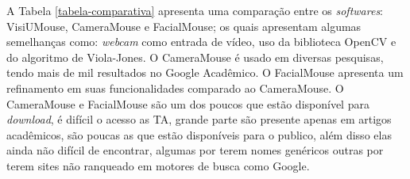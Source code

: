 A Tabela \ref{tabela-comparativa} apresenta uma comparação entre os \textit{softwares}: VisiUMouse, CameraMouse e FacialMouse; os quais apresentam algumas semelhanças como: \textit{webcam} como entrada de vídeo, uso da biblioteca OpenCV e do algoritmo de Viola-Jones. O CameraMouse é usado em diversas pesquisas, tendo mais de mil resultados no Google Acadêmico. O FacialMouse apresenta um refinamento em suas funcionalidades comparado ao CameraMouse. O CameraMouse e FacialMouse são um dos poucos que estão disponível para \textit{download}, é difícil o acesso as TA, grande parte são presente apenas em artigos acadêmicos, são poucas as que estão disponíveis para o publico, além disso elas ainda não difícil de encontrar, algumas por terem nomes genéricos outras por terem sites não ranqueado em motores de busca como Google.
% 
% 
% 
% 

